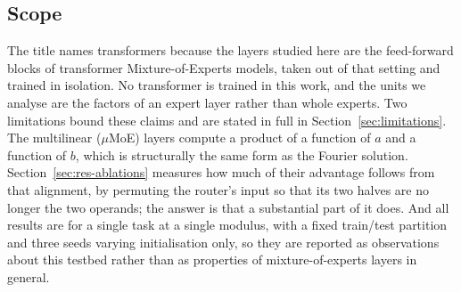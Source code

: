 \subsection{Scope}

The title names transformers because the layers studied here are the
feed-forward blocks of transformer Mixture-of-Experts models, taken out of
that setting and trained in isolation. No transformer is trained in this work,
and the units we analyse are the factors of an expert layer rather than whole
experts. Two limitations bound these claims and are stated in full in
Section~\ref{sec:limitations}. The multilinear ($\mu$MoE) layers compute a
product of a function of $a$ and a function of $b$, which is structurally the
same form as the Fourier solution. Section~\ref{sec:res-ablations} measures how
much of their advantage follows from that alignment, by permuting the router's
input so that its two halves are no longer the two operands; the answer is that
a substantial part of it does. And all results are for a single task at a
single modulus, with a fixed train/test partition and three seeds varying
initialisation only, so they are reported as observations about this testbed
rather than as properties of mixture-of-experts layers in general.